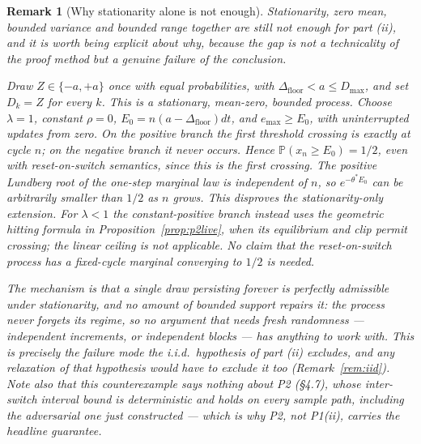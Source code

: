 \documentclass[11pt]{article}
\newtheorem{remark}{Remark}
\newcommand{\Dfloor}{\Delta_{\text{floor}}}
\begin{document}
\begin{remark}[Why stationarity alone is not enough] \label{rem:dep}
Stationarity, zero mean, bounded variance and bounded range together are still not enough for part (ii), and it is worth being explicit about why, because the gap is not a technicality of the proof method but a genuine failure of the conclusion.

Draw $Z\in\{-a,+a\}$ once with equal probabilities, with $\Dfloor<a\le D_{\max}$, and set $D_k=Z$ for every $k$. This is a stationary, mean-zero, bounded process. Choose $\lambda=1$, constant $\rho=0$, $E_0=n(a-\Dfloor)dt$, and $e_{\max}\ge E_0$, with uninterrupted updates from zero. On the positive branch the first threshold crossing is exactly at cycle $n$; on the negative branch it never occurs. Hence $\mathbb{P}(x_n\ge E_0)=1/2$, even with reset-on-switch semantics, since this is the first crossing. The positive Lundberg root of the one-step marginal law is independent of $n$, so $e^{-\theta^*E_0}$ can be arbitrarily smaller than $1/2$ as $n$ grows. This disproves the stationarity-only extension. For $\lambda<1$ the constant-positive branch instead uses the geometric hitting formula in Proposition~\ref{prop:p2live}, when its equilibrium and clip permit crossing; the linear ceiling is not applicable. No claim that the reset-on-switch process has a fixed-cycle marginal converging to $1/2$ is needed.

The mechanism is that a single draw persisting forever is perfectly admissible under stationarity, and no amount of bounded support repairs it: the process never forgets its regime, so no argument that needs fresh randomness --- independent increments, or independent blocks --- has anything to work with. This is precisely the failure mode the i.i.d.\ hypothesis of part (ii) excludes, and any relaxation of that hypothesis would have to exclude it too (Remark~\ref{rem:iid}). Note also that this counterexample says nothing about P2 (\S4.7), whose inter-switch interval bound is deterministic and holds on every sample path, including the adversarial one just constructed --- which is why P2, not P1(ii), carries the headline guarantee.
\end{remark}
\end{document}
